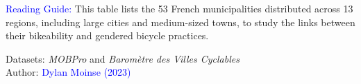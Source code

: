 \begin{table}[h!]
    \label{table-chap4:communes-fub-insee}
        \vspace{5pt}
        \begin{flushleft}\scriptsize
        \textcolor{blue}{Reading Guide:} This table lists the 53 French municipalities distributed across 13 regions, including large cities and medium-sized towns, to study the links between their bikeability and gendered bicycle practices.
        \end{flushleft}
        \begin{flushright}\scriptsize{
        Datasets: \textsl{MOBPro} \textcolor{blue}{\autocite{insee_documentation_2023}} and \textsl{Baromètre des Villes Cyclables} \textcolor{blue}{\autocite{fub_barometre_2021}}
        \\
        Author: \textcolor{blue}{Dylan Moinse (2023)}
        }\end{flushright}
        \end{table}